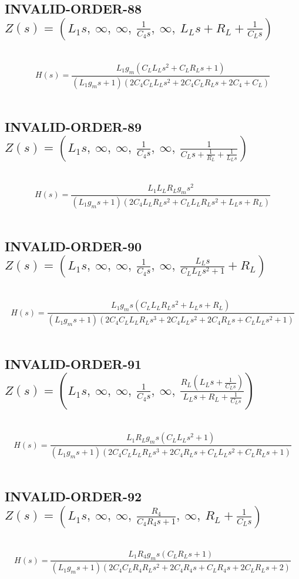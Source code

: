\documentclass{article}
\begin{document}
\subsection{INVALID-ORDER-88 $Z(s) = \left( L_{1} s, \  \infty, \  \infty, \  \frac{1}{C_{4} s}, \  \infty, \  L_{L} s + R_{L} + \frac{1}{C_{L} s}\right)$ } \ 
\textbf{\[H(s) = \frac{L_{1} g_{m} \left(C_{L} L_{L} s^{2} + C_{L} R_{L} s + 1\right)}{\left(L_{1} g_{m} s + 1\right) \left(2 C_{4} C_{L} L_{L} s^{2} + 2 C_{4} C_{L} R_{L} s + 2 C_{4} + C_{L}\right)}\] } \ 
\subsection{INVALID-ORDER-89 $Z(s) = \left( L_{1} s, \  \infty, \  \infty, \  \frac{1}{C_{4} s}, \  \infty, \  \frac{1}{C_{L} s + \frac{1}{R_{L}} + \frac{1}{L_{L} s}}\right)$ } \ 
\textbf{\[H(s) = \frac{L_{1} L_{L} R_{L} g_{m} s^{2}}{\left(L_{1} g_{m} s + 1\right) \left(2 C_{4} L_{L} R_{L} s^{2} + C_{L} L_{L} R_{L} s^{2} + L_{L} s + R_{L}\right)}\] } \ 
\subsection{INVALID-ORDER-90 $Z(s) = \left( L_{1} s, \  \infty, \  \infty, \  \frac{1}{C_{4} s}, \  \infty, \  \frac{L_{L} s}{C_{L} L_{L} s^{2} + 1} + R_{L}\right)$ } \ 
\textbf{\[H(s) = \frac{L_{1} g_{m} s \left(C_{L} L_{L} R_{L} s^{2} + L_{L} s + R_{L}\right)}{\left(L_{1} g_{m} s + 1\right) \left(2 C_{4} C_{L} L_{L} R_{L} s^{3} + 2 C_{4} L_{L} s^{2} + 2 C_{4} R_{L} s + C_{L} L_{L} s^{2} + 1\right)}\] } \ 
\subsection{INVALID-ORDER-91 $Z(s) = \left( L_{1} s, \  \infty, \  \infty, \  \frac{1}{C_{4} s}, \  \infty, \  \frac{R_{L} \left(L_{L} s + \frac{1}{C_{L} s}\right)}{L_{L} s + R_{L} + \frac{1}{C_{L} s}}\right)$ } \ 
\textbf{\[H(s) = \frac{L_{1} R_{L} g_{m} s \left(C_{L} L_{L} s^{2} + 1\right)}{\left(L_{1} g_{m} s + 1\right) \left(2 C_{4} C_{L} L_{L} R_{L} s^{3} + 2 C_{4} R_{L} s + C_{L} L_{L} s^{2} + C_{L} R_{L} s + 1\right)}\] } \ 
\subsection{INVALID-ORDER-92 $Z(s) = \left( L_{1} s, \  \infty, \  \infty, \  \frac{R_{4}}{C_{4} R_{4} s + 1}, \  \infty, \  R_{L} + \frac{1}{C_{L} s}\right)$ } \ 
\textbf{\[H(s) = \frac{L_{1} R_{4} g_{m} s \left(C_{L} R_{L} s + 1\right)}{\left(L_{1} g_{m} s + 1\right) \left(2 C_{4} C_{L} R_{4} R_{L} s^{2} + 2 C_{4} R_{4} s + C_{L} R_{4} s + 2 C_{L} R_{L} s + 2\right)}\] } \ 
\end{document}
